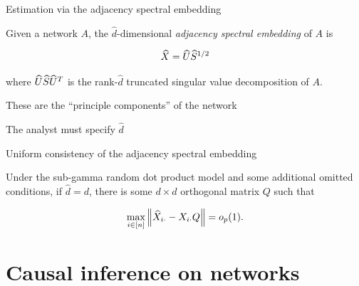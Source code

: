 \documentclass{beamer}
\theoremstyle{remark}
\begin{document}
\begin{frame}{Estimation via the adjacency spectral embedding}


    \begin{definition}[ASE]

        Given a network $A$, the $\widehat{d}$-dimensional \emph{adjacency spectral embedding} of $A$ is

        \begin{align*}
            \widehat{X} = \widehat{U} \widehat{S}^{1/2}
        \end{align*}

        \noindent where $\widehat{U} \widehat{S} \widehat{U}^T$ is the rank-$\widehat{d}$ truncated singular value decomposition of $A$.

    \end{definition}

    These are the ``principle components'' of the network

    The analyst must specify $\widehat{d}$

\end{frame}

\begin{frame}{Uniform consistency of the adjacency spectral embedding}

    \begin{lemma}

        Under the sub-gamma random dot product model and some additional omitted conditions, if $\widehat{d} = d$, there is some $d \times d$ orthogonal matrix $Q$ such that

        \begin{equation*}
            \max_{i \in [n]} \, \norm*{\Xhat_{i \cdot} - \X_{i \cdot} Q} = \op{1}.
        \end{equation*}

    \end{lemma}

\end{frame}

\section{Causal inference on networks}
\end{document}
